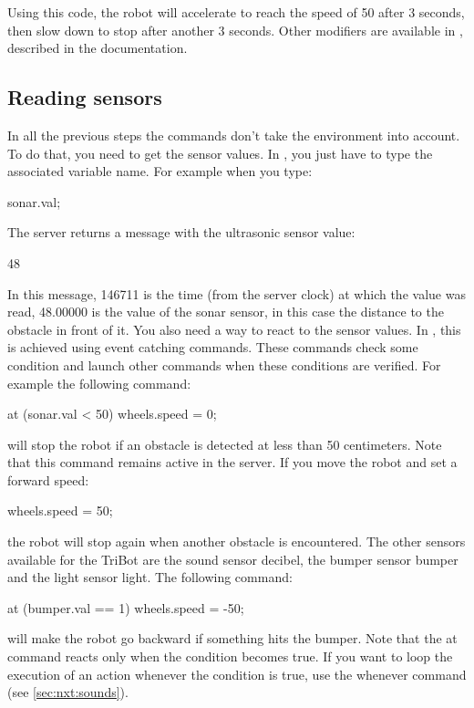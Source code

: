 Using this code, the robot will accelerate to reach the speed of 50 after 3
seconds, then slow down to stop after another 3 seconds.  Other modifiers
are available in \urbi, described in the \urbi documentation.

\subsection{Reading sensors}
In all the previous steps the commands don't take the environment into account.
To do that, you need to get the sensor values. In \urbi, you just have to type
the associated variable name. For example when you type:
\begin{urbiunchecked}
sonar.val;
\end{urbiunchecked}

The server returns a message with the ultrasonic sensor value:
\begin{urbiunchecked}
[00146711] 48
\end{urbiunchecked}

In this message, 146711 is the time (from the server clock) at which the value
was read, 48.00000 is the value of the sonar sensor, in this case the distance
to the obstacle in front of it.
You also need a way to react to the sensor values. In \urbi, this is achieved
using event catching commands. These commands check some condition and launch
other commands when these conditions are verified. For example the following
command:
\begin{urbiunchecked}
at (sonar.val < 50)
  wheels.speed = 0;
\end{urbiunchecked}

\noindent
will stop the robot if an obstacle is detected at less than 50 centimeters.
Note that this command remains active in the server. If you move the robot
and set a forward speed:
\begin{urbiunchecked}
wheels.speed = 50;
\end{urbiunchecked}
\noindent
the robot will stop again when another obstacle is encountered.  The other
sensors available for the TriBot are the sound sensor decibel, the bumper
sensor bumper and the light sensor light. The following command:
\begin{urbiunchecked}
at (bumper.val == 1)
  wheels.speed = -50;
\end{urbiunchecked}
\noindent
will make the robot go backward if something hits the bumper.  Note that the
at command reacts only when the condition becomes true. If you want to loop
the execution of an action whenever the condition is true, use the whenever
command (see \autoref{sec:nxt:sounds}).


